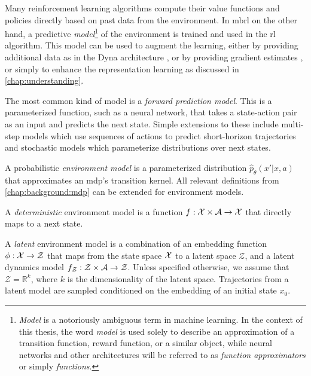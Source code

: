 Many reinforcement learning algorithms compute their value functions and policies directly based on past data from the environment.
In \ac{mbrl} on the other hand, a predictive \emph{model}\footnote{\emph{Model} is a notoriously ambiguous term in machine learning. In the context of this thesis, the word \emph{model} is used solely to describe an approximation of a transition function, reward function, or a similar object, while neural networks and other architectures will be referred to as \emph{function approximators} or simply \emph{functions}.} of the environment is trained and used in the \ac{rl} algorithm.
This model can be used to augment the learning, either by providing additional data as in the Dyna architecture \parencite{dyna}, or by providing gradient estimates \parencite{hafner2020dream,amos2021model}, or simply to enhance the representation learning as discussed in \autoref{chap:understanding}.

The most common kind of model is a \emph{forward prediction model}.
This is a parameterized function, such as a neural network, that takes a state-action pair as an input and predicts the next state.
Simple extensions to these include multi-step models which use sequences of actions to predict short-horizon trajectories and stochastic models which parameterize distributions over next states.

\begin{definition}
    A probabilistic \emph{environment model} is a parameterized distribution $\hat{p}_\theta(x'|x,a)$ that approximates an \ac{mdp}'s transition kernel.
    All relevant definitions from \autoref{chap:background:mdp} can be extended for environment models.
    
    A \emph{deterministic} environment model is a function $f: \mathcal{X} \times \mathcal{A} \rightarrow \mathcal{X}$ that directly maps to a next state.

    A \emph{latent} environment model is a combination of an embedding function $\phi: \mathcal{X} \rightarrow \mathcal{Z}$ that maps from the state space $\mathcal{X}$ to a latent space $\mathcal{Z}$, and a latent dynamics model $f_\mathcal{Z}: \mathcal{Z} \times \mathcal{A} \rightarrow \mathcal{Z}$.
    Unless specified otherwise, we assume that $\mathcal{Z} = \mathbb{R}^k$, where $k$ is the dimensionality of the latent space.
    Trajectories from a latent model are sampled conditioned on the embedding of an initial state $x_0$.
\end{definition}


